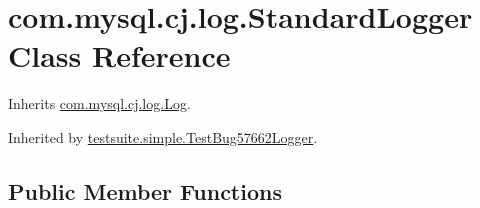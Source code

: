 \hypertarget{classcom_1_1mysql_1_1cj_1_1log_1_1_standard_logger}{}\section{com.\+mysql.\+cj.\+log.\+Standard\+Logger Class Reference}
\label{classcom_1_1mysql_1_1cj_1_1log_1_1_standard_logger}


Inherits \mbox{\hyperlink{interfacecom_1_1mysql_1_1cj_1_1log_1_1_log}{com.\+mysql.\+cj.\+log.\+Log}}.



Inherited by \mbox{\hyperlink{classtestsuite_1_1simple_1_1_test_bug57662_logger}{testsuite.\+simple.\+Test\+Bug57662\+Logger}}.

\subsection*{Public Member Functions}
